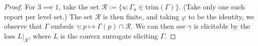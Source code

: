 \documentclass[11pt]{colt2019}
\newcommand{\simplex}{\Delta_\Y}
\newcommand{\R}{\mathcal{R}}
\newcommand{\Y}{\mathcal{Y}}
\newcommand{\inter}[1]{\mathring{#1}}%
\newcommand{\strip}{\mathrm{strip}}
\newcommand{\trim}{\mathrm{trim}}
\begin{document}
\begin{proof}
  For $3 \implies 1$, take the set $\R := \{u : \Gamma_u \in\trim(\Gamma)\}$.
  (Take only one such report per level set.)
  The set $\R$ is then finite, and taking $\varphi$ to be the identity, we observe that $\Gamma$ embeds $\gamma: p \mapsto \Gamma(p) \cap \R$.
  We can then see $\gamma$ is elicitable by the loss $L|_{\R}$, where $L$ is the convex surrogate eliciting $\Gamma$.
\end{proof}

		
		
\end{document}
